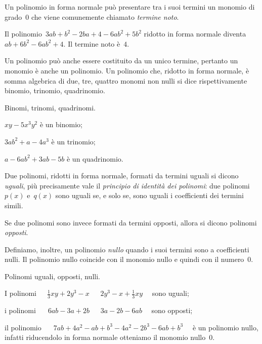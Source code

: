 Un polinomio in forma normale può presentare tra i suoi termini un monomio 
di grado~0 che viene
comunemente chiamato \emph{termine noto}.

\begin{exrig}
\begin{esempio}
Il polinomio~$3ab+b^2-2ba+4-6ab^2+5b^2$ ridotto in forma normale 
diventa~$ab+6b^2-6ab^2+4$. Il termine noto è~$4$.
\end{esempio}
\end{exrig}


Un polinomio può anche essere costituito da un unico termine, pertanto un 
monomio è anche un polinomio.
Un polinomio che, ridotto in forma normale, è somma algebrica di due, tre, 
quattro monomi non nulli si dice
rispettivamente binomio, trinomio, quadrinomio.

\begin{exrig}
\begin{esempio}
Binomi, trinomi, quadrinomi.
\begin{enumeratea}
\item $xy-5x^3y^2$ è un binomio;
\item $3ab^2 +a-4a^3$ è un trinomio;
\item $a-6ab^2+3ab-5b$ è un quadrinomio.
\end{enumeratea}
\end{esempio}
\end{exrig}

\begin{definizione}
Due polinomi, ridotti in forma normale, formati da termini uguali si dicono 
\emph{uguali}, più precisamente vale il \emph{principio di identità dei 
polinomi}:
due polinomi~$p(x)$ e~$q(x)$ sono uguali se, e solo se, sono uguali
i coefficienti dei termini simili.

Se due polinomi sono invece formati da termini opposti, allora si dicono 
polinomi \emph{opposti}.

Definiamo, inoltre, un polinomio \emph{nullo} quando i suoi termini sono a 
coefficienti nulli. Il polinomio nullo
coincide con il monomio nullo e quindi con il numero~0.
\end{definizione}

\begin{exrig}
\begin{esempio}
Polinomi uguali, opposti, nulli.
\begin{enumeratea}
\item I polinomi~$\quad \frac{1}{3}xy+2y^3-x$ $\quad~2y^3-x+\frac{1}{3}xy 
\quad$ sono uguali;
\item i polinomi~$\quad~6ab-3a+2b$ $\quad~3a-2b-6ab \quad$ sono opposti;
\item il polinomio~$\quad~7ab+4a^2-ab+b^3-4a^2-2b^3-6ab+b^3 \quad$ è un 
polinomio nullo, infatti riducendolo in forma normale otteniamo il monomio 
nullo~$0$.
\end{enumeratea}
\end{esempio}
\end{exrig}


